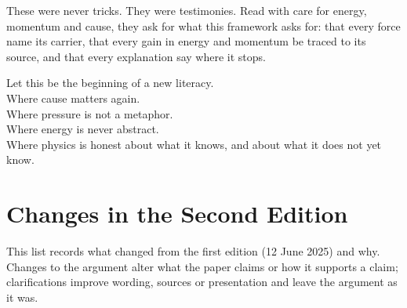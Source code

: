These were never tricks. They were testimonies. Read with care for energy, momentum and cause, they ask for what this framework asks for: that every force name its carrier, that every gain in energy and momentum be traced to its source, and that every explanation say where it stops.

Let this be the beginning of a new literacy.\\
Where cause matters again.\\
Where pressure is not a metaphor.\\
Where energy is never abstract.\\
Where physics is honest about what it knows, and about what it does not yet know.

\clearpage
\section*{Changes in the Second Edition}

This list records what changed from the first edition (12 June 2025) and why. Changes to the argument alter what the paper claims or how it supports a claim; clarifications improve wording, sources or presentation and leave the argument as it was.

